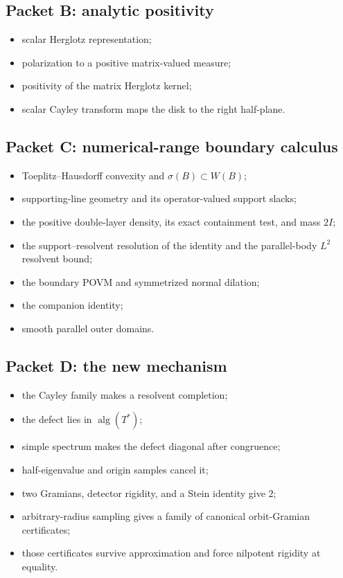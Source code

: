 \documentclass[11pt,oneside,openany]{book}
\theoremstyle{definition}
\theoremstyle{remark}
\newcommand{\alg}{\operatorname{alg}}
\newcommand{\spec}{\sigma}
\begin{document}
\subsection*{Packet B: analytic positivity}

\begin{itemize}
  \item scalar Herglotz representation;
  \item polarization to a positive matrix-valued measure;
  \item positivity of the matrix Herglotz kernel;
  \item scalar Cayley transform maps the disk to the right half-plane.
\end{itemize}

\subsection*{Packet C: numerical-range boundary calculus}

\begin{itemize}
  \item Toeplitz--Hausdorff convexity and
  \(\spec(B)\subset W(B)\);
  \item supporting-line geometry and its operator-valued support
  slacks;
  \item the positive double-layer density, its exact containment test,
  and mass \(2I\);
  \item the support--resolvent resolution of the identity and the
  parallel-body \(L^2\) resolvent bound;
  \item the boundary POVM and symmetrized normal dilation;
  \item the companion identity;
  \item smooth parallel outer domains.
\end{itemize}

\subsection*{Packet D: the new mechanism}

\begin{itemize}
  \item the Cayley family makes a resolvent completion;
  \item the defect lies in \(\alg(T^*)\);
  \item simple spectrum makes the defect diagonal after congruence;
  \item half-eigenvalue and origin samples cancel it;
  \item two Gramians, detector rigidity, and a Stein identity give
  \(2\);
  \item arbitrary-radius sampling gives a family of canonical
  orbit-Gramian certificates;
  \item those certificates survive approximation and force nilpotent
  rigidity at equality.
\end{itemize}
\end{document}
